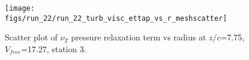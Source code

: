 \begin{figure}[H]
\centering
\texttt{[image: figs/run\_22/run\_22\_turb\_visc\_ettap\_vs\_r\_meshscatter]}
\caption{Scatter plot of $\nu_T$ pressure relaxation term vs radius at $z/c$=7.75, $V_{free}$=17.27, station 3.}
\label{fig:run_22_turb_visc_ettap_vs_r_meshscatter}
\end{figure}


